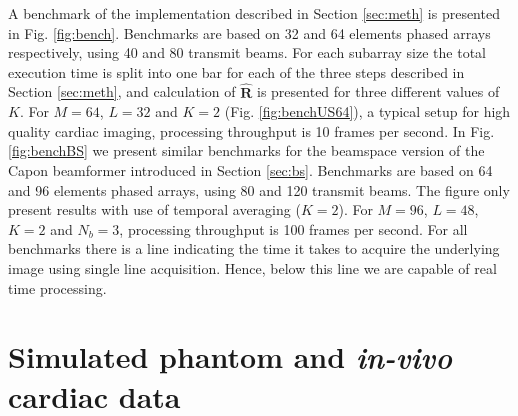 \documentclass[12pt,journal,onecolumn]{IEEEtran}
\newcommand{\mat}[1]{\mathbf{#1}}
\begin{document}
A benchmark of the implementation described in Section \ref{sec:meth} is presented in Fig. \ref{fig:bench}. Benchmarks are based on 32 and 64 elements phased arrays respectively, using 40 and 80 transmit beams. For each subarray size the total execution time is split into one bar for each of the three steps described in Section \ref{sec:meth}, and calculation of $\mat{\hat{R}}$ is presented for three different values of $K$. For $M=64$, $L=32$ and $K=2$ (Fig. \ref{fig:benchUS64}), a typical setup for high quality cardiac imaging, processing throughput is 10 frames per second. In Fig. \ref{fig:benchBS} we present similar benchmarks for the beamspace version of the Capon beamformer introduced in Section \ref{sec:bs}. Benchmarks are based on 64 and 96 elements phased arrays, using 80 and 120 transmit beams. The figure only present results with use of temporal averaging ($K=2$). For $M=96$, $L=48$, $K=2$ and $N_b=3$, processing throughput is 100 frames per second. For all benchmarks there is a line indicating the time it takes to acquire the underlying image using single line acquisition. Hence, below this line we are capable of real time processing.

\section{Simulated phantom and \textit{in-vivo} cardiac data}
\end{document}
